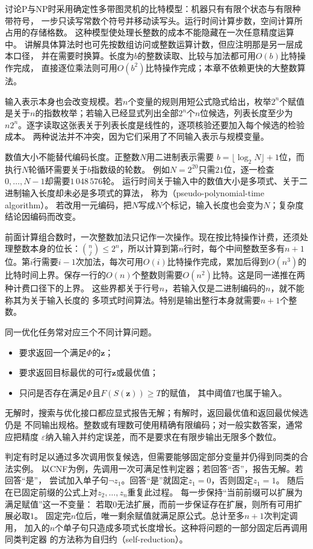 讨论P与NP时采用确定性多带图灵机的比特模型：机器只有有限个状态与有限种带符号，
一步只读写常数个符号并移动读写头。运行时间计算步数，空间计算所占用的存储格数。
这种模型使处理长整数的成本不能隐藏在一次任意精度运算中。
讲解具体算法时也可先按数组访问或整数运算计数，但应注明那是另一层成本口径，
并在需要时换算。长度为$b$的整数读取、比较与加法都可用$O(b)$比特操作完成，
直接逐位乘法则可用$O(b^2)$比特操作完成；本章不依赖更快的大整数算法。

输入表示本身也会改变规模。若$n$个变量的规则用短公式隐式给出，枚举$2^n$个赋值
是关于$n$的指数枚举；若输入已经显式列出全部$2^n$个$n$位候选，列表长度至少为
$n2^n$。逐字读取这张表关于列表长度是线性的，逐项核验还要加入每个候选的检验成本。
两种说法并不冲突，因为它们采用了不同输入表示与规模变量。

数值大小不能替代编码长度。正整数$N$用二进制表示需要
$b=\lfloor\log_2N\rfloor+1$位，而执行$N$轮循环需要关于$b$指数级的轮数。
例如$N=2^{20}$只需$21$位，逐一检查$0,\ldots,N-1$却需要$1\,048\,576$轮。
运行时间关于输入中的数值大小是多项式、关于二进制输入长度却未必是多项式的算法，
称为（pseudo-polynomial-time algorithm）。
若改用一元编码，把$N$写成$N$个标记，输入长度也会变为$N$；复杂度结论因编码而改变。

前面计算组合数时，一次整数加法只记作一次操作。现在按比特操作计费，还须处理整数本身的位长：$\binom nj\leq2^n$，所以计算到第$n$行时，每个中间整数至多有$n+1$位。第$i$行需要$i-1$次加法，每次可用$O(i)$比特操作完成，累加后得到$O(n^3)$的比特时间上界。保存一行的$O(n)$个整数则需要$O(n^2)$比特。这是同一递推在两种计费口径下的上界。
这些界都关于行号$n$，若输入仅是二进制编码的$n$，就不能称其为关于输入长度的
多项式时间算法。特别是输出整行本身就需要$n+1$个整数。

同一优化任务常对应三个不同计算问题。
\begin{itemize}
  \item {}要求返回一个满足$\Phi$的$\bm{z}$；
  \item {}要求返回目标最优的可行$\bm{z}$或最优值；
  \item {}只问是否存在满足$\Phi$且$F(S(\bm{z}))\geq T$的赋值，
  其中阈值$T$也属于输入。
\end{itemize}
无解时，搜索与优化接口都应显式报告无解；有解时，返回最优值和返回最优候选仍是
不同输出规格。整数或有理数可使用精确有限编码；对一般实数答案，通常应把精度
$\varepsilon$纳入输入并约定误差，而不是要求在有限步输出无限多个数位。

判定有时足以通过多次调用恢复候选，但需要能够固定部分变量并仍得到同类的合法实例。
以CNF为例，先调用一次可满足性判定器；若回答“否”，报告无解。若回答“是”，
尝试加入单子句$\neg z_1$。回答“是”就固定$z_1=0$，否则固定$z_1=1$。
随后在已固定前缀的公式上对$z_2,\ldots,z_n$重复此过程。
每一步保持“当前前缀可以扩展为满足赋值”这一不变量：
若取$0$无法扩展，而前一步保证存在扩展，则所有可用扩展必取$1$。
固定完$n$位后，唯一剩余赋值就满足原公式。总计至多$n+1$次判定调用，
加入的$n$个单子句只造成多项式长度增长。这种将问题的一部分固定后再调用同类判定器
的方法称为自归约（self-reduction）。

